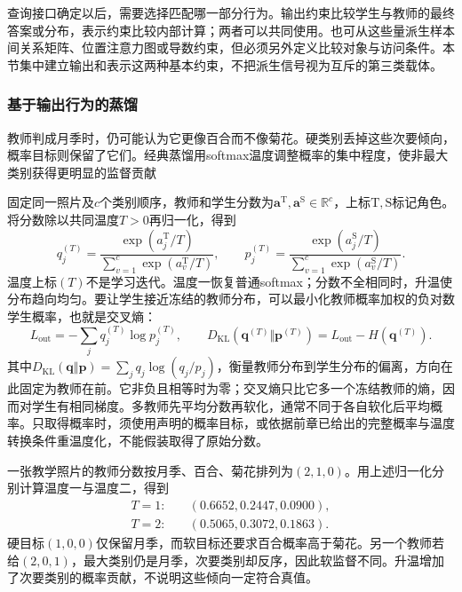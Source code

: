 查询接口确定以后，需要选择匹配哪一部分行为。输出约束比较学生与教师的最终答案或分布，表示约束比较内部计算；两者可以共同使用。也可从这些量派生样本间关系矩阵、位置注意力图或导数约束，但必须另外定义比较对象与访问条件。本节集中建立输出和表示这两种基本约束，不把派生信号视为互斥的第三类载体。

\subsubsection{基于输出行为的蒸馏}
\label{sec:ket-integration-output-distillation}

教师判成月季时，仍可能认为它更像百合而不像菊花。硬类别丢掉这些次要倾向，概率目标则保留了它们。经典蒸馏用softmax温度调整概率的集中程度，使非最大类别获得更明显的监督贡献

固定同一照片及$c$个类别顺序，教师和学生分数为$\bm{a}^{\mathrm{T}},\bm{a}^{\mathrm{S}}\in\mathbb{R}^{c}$，上标$\mathrm{T},\mathrm{S}$标记角色。将分数除以共同温度$T>0$再归一化，得到
\begin{equation}
  q_j^{(T)}=\frac{\exp(a_j^{\mathrm{T}}/T)}
                    {\sum_{v=1}^{c}\exp(a_v^{\mathrm{T}}/T)},\qquad
  p_j^{(T)}=\frac{\exp(a_j^{\mathrm{S}}/T)}
                    {\sum_{v=1}^{c}\exp(a_v^{\mathrm{S}}/T)}.
  \label{eq:ket-integration-temperature}
\end{equation}
温度上标$(T)$不是学习迭代。温度一恢复普通softmax；分数不全相同时，升温使分布趋向均匀。要让学生接近冻结的教师分布，可以最小化教师概率加权的负对数学生概率，也就是交叉熵：
\begin{equation}
  L_{\mathrm{out}}
  =-\sum_j q_j^{(T)}\log p_j^{(T)},\qquad
  D_{\mathrm{KL}}(\bm{q}^{(T)}\Vert\bm{p}^{(T)})
  =L_{\mathrm{out}}-H(\bm{q}^{(T)}).
  \label{eq:ket-integration-output-loss}
\end{equation}
其中$D_{\mathrm{KL}}(\bm{q}\Vert\bm{p})=\sum_jq_j\log(q_j/p_j)$，衡量教师分布到学生分布的偏离，方向在此固定为教师在前。它非负且相等时为零；交叉熵只比它多一个冻结教师的熵，因而对学生有相同梯度。多教师先平均分数再软化，通常不同于各自软化后平均概率。只取得概率时，须使用声明的概率目标，或依据前章已给出的完整概率与温度转换条件重温度化，不能假装取得了原始分数。

\begin{example}[三个类别携带的信息]
  \label{ex:ket-integration-soft-labels}
  一张教学照片的教师分数按月季、百合、菊花排列为$(2,1,0)$。用上述归一化分别计算温度一与温度二，得到
  \[
    \begin{aligned}
      T=1:\quad &(0.6652,0.2447,0.0900),\\
      T=2:\quad &(0.5065,0.3072,0.1863).
    \end{aligned}
  \]
  硬目标$(1,0,0)$仅保留月季，而软目标还要求百合概率高于菊花。另一个教师若给$(2,0,1)$，最大类别仍是月季，次要类别却反序，因此软监督不同。升温增加了次要类别的概率贡献，不说明这些倾向一定符合真值。
\end{example}

